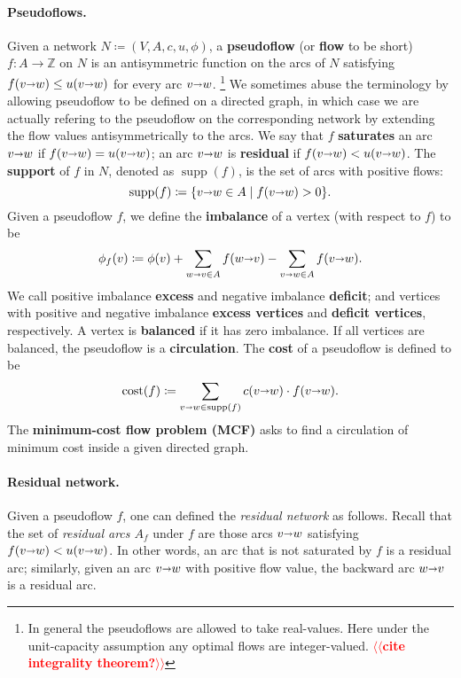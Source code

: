 \documentclass[11pt]{article}
\makeatletter
\def\ints{\mathbb{Z}}
\def\fsupply{\phi}
\def\arcto{\mathord\shortrightarrow}
\def\arc#1#2{#1\arcto#2}
\def\cost{\operatorname{cost}}
\def\supp{\operatorname{supp}}
\theoremstyle{plain}
\numberwithin{figure}{section}
\def\EMPH#1{\textbf{\boldmath #1}}
\def\n@te#1{\textsf{\boldmath \textbf{$\langle\!\langle$#1$\rangle\!\rangle$}}\leavevmode}
\def\note#1{\textcolor{red}{\n@te{#1}}}
\makeatother
\begin{document}
\paragraph{Pseudoflows.}
Given a network $N \coloneqq (V,A,c,u,\fsupply)$,
a \EMPH{pseudoflow} (or \EMPH{flow} to be short) $f\colon A \to \ints$ on $N$ is an antisymmetric function on the arcs of $N$
satisfying $f(\arc vw) \leq u(\arc vw)$ for every arc $\arc vw$.%
\footnote{In general the pseudoflows are allowed to take real-values.  Here under the unit-capacity assumption any optimal flows are integer-valued. \note{cite integrality theorem?}}
%
We sometimes abuse the terminology by allowing pseudoflow to be defined on a directed graph, in which case we are actually refering to the pseudoflow on the corresponding network by extending the flow values antisymmetrically to the arcs.
%
We say that $f$ \EMPH{saturates} an arc $\arc vw$ if $f(\arc vw) = u(\arc vw)$; an arc $\arc vw$ is \EMPH{residual} if $f(\arc vw) < u(\arc vw)$.
The \EMPH{support} of $f$ in $N$, denoted as \EMPH{$\supp(f)$}, is the set of arcs with positive flows:
\[
\supp(f) \coloneqq \{\arc vw \in A \mid f(\arc vw) > 0\}.
\]
%
Given a pseudoflow $f$, we define the \EMPH{imbalance} of a vertex (with respect to $f$) to be
\[
\EMPH{$\fsupply_f(v)$} \coloneqq \fsupply(v) + \sum_{\arc wv \in A}{f(\arc wv)} - \sum_{\arc vw \in A}{f(\arc vw)}.
\]
We call positive imbalance \EMPH{excess} and negative imbalance \EMPH{deficit};
and vertices with positive and negative imbalance \EMPH{excess vertices} and
\EMPH{deficit vertices}, respectively.
A vertex is \EMPH{balanced} if it has zero imbalance.
If all vertices are balanced, the pseudoflow is a \EMPH{circulation}.
The \EMPH{cost} of a pseudoflow
is defined to be
\[
 \EMPH{$\cost(f)$} \coloneqq \sum_{\arc vw \in \supp(f)} c(\arc vw) \cdot f(\arc vw).
\]
%
The \EMPH{minimum-cost flow problem (MCF)} asks to find a circulation of minimum cost inside a given directed graph.

\paragraph{Residual network.}
Given a pseudoflow $f$, one can defined the \emph{residual network} as follows.
%
Recall that the set of \emph{residual arcs $A_f$} under $f$ are those arcs $\arc vw$ satisfying $f(\arc vw) < u(\arc vw)$.  In other words, an arc that is not saturated by $f$ is a residual arc; similarly, given an arc $\arc vw$ with positive flow value, the backward arc $\arc wv$ is a residual arc.
\end{document}
